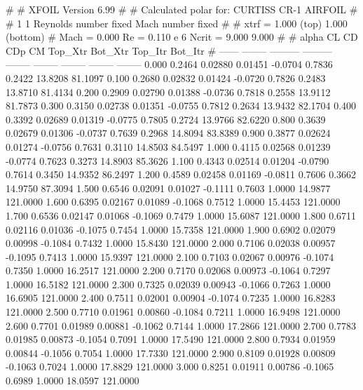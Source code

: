#  
#       XFOIL         Version 6.99
#  
# Calculated polar for: CURTISS CR-1 AIRFOIL                            
#  
# 1 1 Reynolds number fixed          Mach number fixed         
#  
# xtrf =   1.000 (top)        1.000 (bottom)  
# Mach =   0.000     Re =     0.110 e 6     Ncrit =   9.000  9.000
#  
#   alpha    CL        CD       CDp       CM     Top_Xtr  Bot_Xtr  Top_Itr  Bot_Itr
#  ------ -------- --------- --------- -------- -------- -------- -------- --------
   0.000   0.2464   0.02880   0.01451  -0.0704   0.7836   0.2422  13.8208  81.1097
   0.100   0.2680   0.02832   0.01424  -0.0720   0.7826   0.2483  13.8710  81.4134
   0.200   0.2909   0.02790   0.01388  -0.0736   0.7818   0.2558  13.9112  81.7873
   0.300   0.3150   0.02738   0.01351  -0.0755   0.7812   0.2634  13.9432  82.1704
   0.400   0.3392   0.02689   0.01319  -0.0775   0.7805   0.2724  13.9766  82.6220
   0.800   0.3639   0.02679   0.01306  -0.0737   0.7639   0.2968  14.8094  83.8389
   0.900   0.3877   0.02624   0.01274  -0.0756   0.7631   0.3110  14.8503  84.5497
   1.000   0.4115   0.02568   0.01239  -0.0774   0.7623   0.3273  14.8903  85.3626
   1.100   0.4343   0.02514   0.01204  -0.0790   0.7614   0.3450  14.9352  86.2497
   1.200   0.4589   0.02458   0.01169  -0.0811   0.7606   0.3662  14.9750  87.3094
   1.500   0.6546   0.02091   0.01027  -0.1111   0.7603   1.0000  14.9877 121.0000
   1.600   0.6395   0.02167   0.01089  -0.1068   0.7512   1.0000  15.4453 121.0000
   1.700   0.6536   0.02147   0.01068  -0.1069   0.7479   1.0000  15.6087 121.0000
   1.800   0.6711   0.02116   0.01036  -0.1075   0.7454   1.0000  15.7358 121.0000
   1.900   0.6902   0.02079   0.00998  -0.1084   0.7432   1.0000  15.8430 121.0000
   2.000   0.7106   0.02038   0.00957  -0.1095   0.7413   1.0000  15.9397 121.0000
   2.100   0.7103   0.02067   0.00976  -0.1074   0.7350   1.0000  16.2517 121.0000
   2.200   0.7170   0.02068   0.00973  -0.1064   0.7297   1.0000  16.5182 121.0000
   2.300   0.7325   0.02039   0.00943  -0.1066   0.7263   1.0000  16.6905 121.0000
   2.400   0.7511   0.02001   0.00904  -0.1074   0.7235   1.0000  16.8283 121.0000
   2.500   0.7710   0.01961   0.00860  -0.1084   0.7211   1.0000  16.9498 121.0000
   2.600   0.7701   0.01989   0.00881  -0.1062   0.7144   1.0000  17.2866 121.0000
   2.700   0.7783   0.01985   0.00873  -0.1054   0.7091   1.0000  17.5490 121.0000
   2.800   0.7934   0.01959   0.00844  -0.1056   0.7054   1.0000  17.7330 121.0000
   2.900   0.8109   0.01928   0.00809  -0.1063   0.7024   1.0000  17.8829 121.0000
   3.000   0.8251   0.01911   0.00786  -0.1065   0.6989   1.0000  18.0597 121.0000
